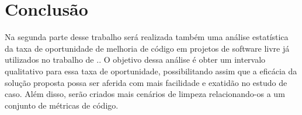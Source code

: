 \chapter{Conclusão}
\label{chap:conclusão}


Na segunda parte desse trabalho será realizada também uma análise estatística da
taxa de oportunidade de melhoria de código em projetos de software livre já utilizados no
trabalho de .. O objetivo dessa análise é obter um intervalo qualitativo
para essa taxa de oportunidade, possibilitando assim que a eficácia da solução proposta
possa ser aferida com mais facilidade e exatidão no estudo de caso. Além disso, serão
criados mais cenários de limpeza relacionando-os a um conjunto de métricas de código.


